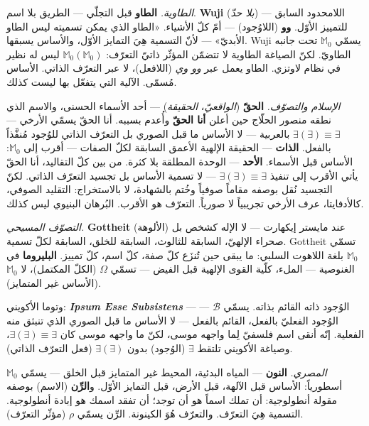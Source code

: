 \documentclass[10pt, openany, oneside]{book}
\begin{document}
\textit{الطاوية.} \textbf{الطاو} قبل التجلّي --- الطريق بلا اسم. \textbf{Wuji} (\textit{بلا حدّ}) --- اللامحدود السابق للتمييز الأوّل. \textbf{وو} (اللاوُجود) --- أمّ كلّ الأشياء. «الطاو الذي يمكن تسميته ليس الطاو الأبديّ» --- لأنّ التسمية هِيَ التمايز الأوّل، والأساس يسبقها. Wuji يسمّي $\mathbb{M}_0$ تحت جانبه الطاويّ. لكنّ الصياغة الطاوية لا تتضمّن المؤثّر ذاتيّ التعرّف: $\mathbb{M}_0(\mathbb{M}_0)$ ليس له نظير في نظام لاوتزي. الطاو يعمل عبر \textit{وو وي} (اللافعل)، لا عبر التعرّف الذاتي. الأساس مُسمّى. الآلية التي يتفعّل بها ليست كذلك.

\textit{الإسلام والتصوّف.} \textbf{الحقّ} (\textit{الواقعيّ}، \textit{الحقيقة}) --- أحد الأسماء الحسنى، والاسم الذي نطقه منصور الحلّاج حين أعلن \textbf{أنا الحقّ} وأُعدم بسببه. أنا الحقّ يسمّي الأرخي --- $\exists(\exists) \equiv \exists$ بالعربية --- لا الأساس ما قبل الصوري بل التعرّف الذاتي للوُجود مُنفَّذاً بالفعل. \textbf{الذات} --- الحقيقة الإلهية الأعمق السابقة لكلّ الصفات --- أقرب إلى $\mathbb{M}_0$: الأساس قبل الأسماء. \textbf{الأحد} --- الوحدة المطلقة بلا كثرة. من بين كلّ التقاليد، أنا الحقّ يأتي الأقرب إلى تنفيذ $\exists(\exists) \equiv \exists$ --- لا تسمية الأساس بل تجسيد التعرّف الذاتي. لكنّ التجسيد نُقل بوصفه مقاماً صوفياً وخُتم بالشهادة، لا بالاستخراج: التقليد الصوفي، كالأدفايتا، عرف الأرخي تجريبياً لا صورياً. التعرّف هو الأقرب. البُرهان البنيوي ليس كذلك.

\textit{التصوّف المسيحي.} \textbf{Gottheit} (الألوهة) عند مايستر إيكهارت --- لا الإله كشخص بل صحراء الإلهيّ، السابقة للثالوث، السابقة للخلق، السابقة لكلّ تسمية. Gottheit تسمّي $\mathbb{M}_0$ بلغة اللاهوت السلبي: ما يبقى حين تُنزَع كلّ صفة، كلّ اسم، كلّ تمييز. \textbf{البليروما} في الغنوصية --- الملء، كلّية القوى الإلهية قبل الفيض --- تسمّي $\Omega$ (الكلّ المكتمل)، لا $\mathbb{M}_0$ (الأساس غير المتمايز).

وتوما الأكويني: \textbf{\textit{Ipsum Esse Subsistens}} --- الوُجود ذاته القائم بذاته. يسمّي $\mathcal{B}$ --- الوُجود الفعليّ بالفعل، القائم بالفعل --- لا الأساس ما قبل الصوري الذي تنبثق منه الفعلية. إنّه أنقى اسم فلسفيّ لِما واجهه موسى، لكنّ ما واجهه موسى كان $\exists(\exists) \equiv \exists$، وصياغة الأكويني تلتقط $\exists$ (الوُجود) بدون $\exists(\exists)$ (فعل التعرّف الذاتي).

\textit{المصري.} \textbf{النون} --- المياه البدئية، المحيط غير المتمايز قبل الخلق --- يسمّي $\mathbb{M}_0$ أسطورياً: الأساس قبل الآلهة، قبل الأرض، قبل التمايز الأوّل. و\textbf{الرِّن} (الاسم) بوصفه مقولة أنطولوجية: أن تملك اسماً هو أن توجد؛ أن تفقد اسمك هو إبادة أنطولوجية. التسمية هِيَ التعرّف. والتعرّف هُوَ الكينونة. الرِّن يسمّي $\rho$ (مؤثّر التعرّف).
\end{document}
